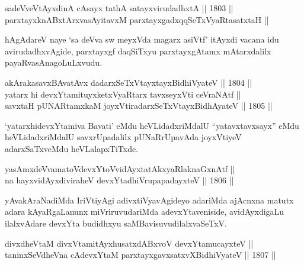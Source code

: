 \begin{shl}
sadeVveVtAyxdinA cAsayx tathA satayxvirudadhxtA ||  1803 ||  \\
parxtayxknABxtArxvasAyitavxM parxtayxgadxqqSeTxVyaRtasatxtaH ||
\end{shl}

\begin{artha}
hAgAdareV naye `sa deVva sw meyxVda magarx asiVtf' itAyxdi vacana idu avirudadhxvAgide, parxtayxgf
daqSiTxyu parxtayxgAtamx mAtarxdalilx payaRvasAnagoLuLxvudu.
\end{artha}

\begin{shl}
akArakasavxBAvatAvx \footnotemark[1]dadarxSeTxVtayxtayxBidhiVyateV ||  1804 ||  \\
yatarx hi devxYtamituyxketxVyaRtarx tavxseyxVti ceVraNAtf || \\
savxtaH pUNARtamxkaM joyxVtiradarxSeTxVtayxBidhAyateV ||  1805 ||  
\end{shl}

\begin{artha}
`yatarxhidevxYtamiva Bavati' eMdu heVLidadxriMdalU ``yatavxtavxsayx'' eMdu heVLidadxriMdalU
savxrUpadalilx pUNaRrUpavAda joyxVtiyeV adarxSaTxveMdu heVLalapxTiTxde.
\end{artha}


\begin{shl}
yasAmxdeVvamatoV\s devxYtoV\s vidAyxtatAkxyaRlaknaGxnAtf || \\
na hayxvidAyxdiviraheV devxYtadhiVrupapadayxteV ||  1806 ||  
\end{shl}

\begin{artha}
yAvakAraNadiMda IriVtiyAgi adivxtiVyavAgideyo adariMda ajAcnxna matutx
adara kAyaRgaLanunx miVriruvudariMda adevxYtaveniside, avidAyxdigaLu
ilalxvAdare devxYta budidhxyu saMBavisuvudilalxvaSeTxV.
\end{artha}


\begin{shl}
divxdheVtaM divxVtamitAyxhusatxdABxvoV devxYtamucayxteV || \\
taninxSeVdheVna cAdevxYtaM parxtayxgavxsatxvXBidhiVyateV ||  1807 ||  
\end{shl}

